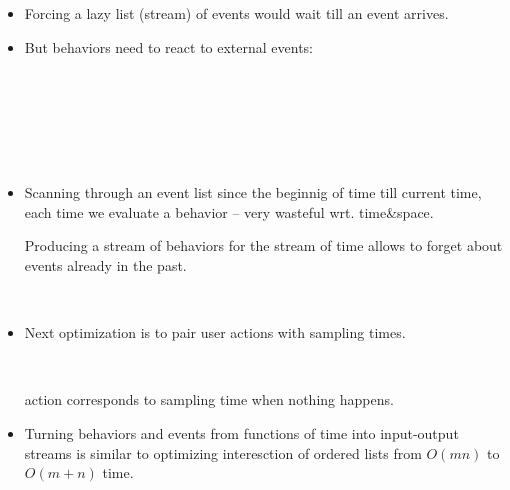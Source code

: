 \documentclass{beamer}
\begin{document}
\begin{itemize}
  \item Forcing a lazy list (stream) of events would wait till an event
  arrives.
  
  \item But behaviors need to react to external events:
  
  {\small{{}{}{\hlopt{=}}{\hlendline{}}\\
  {\hlopt{\textbar }}{}{}{}{\hlopt{*
  }}{}{\hlendline{}}\\
  {\hlopt{\textbar }}{}{}{}{\hlopt{*
  }}{}{\hlopt{* }}{}{\hlopt{*
  }}{}{\hlendline{}}\\
  {\hlopt{\textbar }}{}{}{}{\hlopt{*
  }}{}{\hlendline{}}\\
  {\hlopt{\textbar }}{}{}{}{\hlopt{*
  }}{}{\hlendline{}}\\
  {}{}{\hlopt{=
  }}{}{\hlopt{-> }}{}{\hlopt{-> }}{}{\hlendline{}}}}
  
  \item Scanning through an event list since the beginnig of time till current
  time, each time we evaluate a behavior -- very wasteful wrt. time\&space.
  
  Producing a stream of behaviors for the stream of time allows to forget
  about events already in the past.
  
  {}{}{\hlopt{=}}{\hlendline{}}\\
  {}{\hlopt{-> }}{}{\hlopt{-> }}{}{\hlendline{}}
  
  \item Next optimization is to pair user actions with sampling times.
  
  {}{}{\hlopt{=}}{\hlendline{}}\\
  {}{}{\hlopt{* }}{}{\hlopt{-> }}{}{\hlendline{}}
  
  {} action corresponds to sampling time when nothing happens.
  
  \item Turning behaviors and events from functions of time into input-output
  streams is similar to optimizing interesction of ordered lists from $O (mn)$
  to $O (m + n)$ time.
  

\end{itemize}
\end{document}
